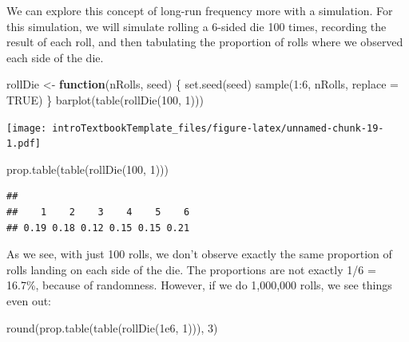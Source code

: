 \documentclass[
]{book}
\newenvironment{Shaded}{\begin{snugshade}}{\end{snugshade}}
\newcommand{\AttributeTok}[1]{\textcolor[rgb]{0.77,0.63,0.00}{#1}}
\newcommand{\ConstantTok}[1]{\textcolor[rgb]{0.00,0.00,0.00}{#1}}
\newcommand{\ControlFlowTok}[1]{\textcolor[rgb]{0.13,0.29,0.53}{\textbf{#1}}}
\newcommand{\DecValTok}[1]{\textcolor[rgb]{0.00,0.00,0.81}{#1}}
\newcommand{\FloatTok}[1]{\textcolor[rgb]{0.00,0.00,0.81}{#1}}
\newcommand{\FunctionTok}[1]{\textcolor[rgb]{0.00,0.00,0.00}{#1}}
\newcommand{\NormalTok}[1]{#1}
\newcommand{\OtherTok}[1]{\textcolor[rgb]{0.56,0.35,0.01}{#1}}
\newcommand{\SpecialCharTok}[1]{\textcolor[rgb]{0.00,0.00,0.00}{#1}}
\theoremstyle{definition}
\theoremstyle{definition}
\theoremstyle{definition}
\theoremstyle{remark}
\begin{document}
We can explore this concept of long-run frequency more with a simulation. For this simulation, we will simulate rolling a 6-sided die 100 times, recording the result of each roll, and then tabulating the proportion of rolls where we observed each side of the die.

\begin{Shaded}
\begin{Highlighting}[]
\NormalTok{rollDie }\OtherTok{\textless{}{-}} \ControlFlowTok{function}\NormalTok{(nRolls, seed) \{}
    \FunctionTok{set.seed}\NormalTok{(seed)}
    \FunctionTok{sample}\NormalTok{(}\DecValTok{1}\SpecialCharTok{:}\DecValTok{6}\NormalTok{, nRolls, }\AttributeTok{replace =} \ConstantTok{TRUE}\NormalTok{)}
\NormalTok{\}}
\FunctionTok{barplot}\NormalTok{(}\FunctionTok{table}\NormalTok{(}\FunctionTok{rollDie}\NormalTok{(}\DecValTok{100}\NormalTok{, }\DecValTok{1}\NormalTok{)))}
\end{Highlighting}
\end{Shaded}

\texttt{[image: introTextbookTemplate\_files/figure-latex/unnamed-chunk-19-1.pdf]}

\begin{Shaded}
\begin{Highlighting}[]
\FunctionTok{prop.table}\NormalTok{(}\FunctionTok{table}\NormalTok{(}\FunctionTok{rollDie}\NormalTok{(}\DecValTok{100}\NormalTok{, }\DecValTok{1}\NormalTok{)))}
\end{Highlighting}
\end{Shaded}

\begin{verbatim}
## 
##    1    2    3    4    5    6 
## 0.19 0.18 0.12 0.15 0.15 0.21
\end{verbatim}

As we see, with just 100 rolls, we don't observe exactly the same proportion of rolls landing on each side of the die. The proportions are not exactly 1/6 = 16.7\%, because of randomness. However, if we do 1,000,000 rolls, we see things even out:

\begin{Shaded}
\begin{Highlighting}[]
\FunctionTok{round}\NormalTok{(}\FunctionTok{prop.table}\NormalTok{(}\FunctionTok{table}\NormalTok{(}\FunctionTok{rollDie}\NormalTok{(}\FloatTok{1e6}\NormalTok{, }\DecValTok{1}\NormalTok{))), }\DecValTok{3}\NormalTok{)}
\end{Highlighting}
\end{Shaded}
\end{document}
